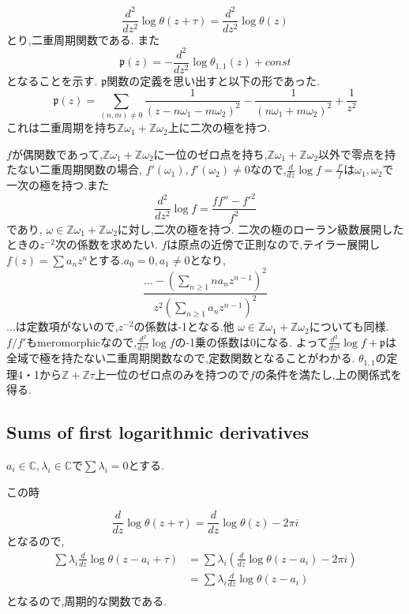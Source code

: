 \documentclass[uplatex,b5j,11pt]{jsbook}
\begin{document}
\begin{equation*}
    \frac{d^2}{dz^2}\log \theta(z + \tau)= \frac{d^2}{dz^2}\log \theta(z)
\end{equation*}
とり,二重周期関数である.
また
\begin{equation*}
    \mathfrak{p}(z) = - \frac{d^2}{dz^2} \log \theta_{1, 1}(z) + const
\end{equation*}
となることを示す.
$\mathfrak{p}$関数の定義を思い出すと以下の形であった.
\begin{equation*}
    \mathfrak{p}(z) = \sum_{(n,m) \neq 0} \frac{1}{(z - n \omega_1 - m \omega_2)^2} - \frac{1}{(n \omega_1 + m \omega_2)^2 } + \frac{1}{z^2}
\end{equation*}
これは二重周期を持ち$\mathbb{Z}\omega_1 + \mathbb{Z}\omega_2$上に二次の極を持つ.

$f$が偶関数であって,$\mathbb{Z}\omega_1 + \mathbb{Z}\omega_2$に一位のゼロ点を持ち,$\mathbb{Z}\omega_1 + \mathbb{Z}\omega_2$以外で零点を持たない二重周期関数の場合,
$f'(\omega_1) , f'(\omega_2) \neq 0$なので,$\frac{d}{dz} \log f = \frac{f'}{f}$は$\omega_1, \omega_2$で一次の極を持つ.また
\begin{equation*}
\frac{d^2}{dz^2}\log f = \frac{ f f'' - f'^2 }{f^2}
\end{equation*}
であり, $\omega \in \mathbb{Z}\omega_1 + \mathbb{Z}\omega_2$に対し,二次の極を持つ.
二次の極のローラン級数展開したときの$z^{-2}$次の係数を求めたい.
$f$は原点の近傍で正則なので,テイラー展開し$f(z)=\sum a_nz^n$とする.$a_0=0, a_1\neq 0$となり,
\begin{equation*}
\frac{... -  (\sum_{n \ge 1} n a_n z^{n-1})^2 }{z^2 (\sum_{n \ge 1} a_nz^{n-1})^2}
\end{equation*}
...は定数項がないので,$z^{-2}$の係数は-1となる.他 $\omega \in \mathbb{Z}\omega_1 + \mathbb{Z}\omega_2$についても同様.
$f/f'$もmeromorphicなので,$\frac{d^2}{dz^2}\log f$の-1乗の係数は0になる.
よって$\frac{d^2}{dz^2}\log f + \mathfrak{p}$は全域で極を持たない二重周期関数なので,定数関数となることがわかる.
$\theta_{1,1}$の定理4・1から$\mathbb{Z}+ \mathbb{Z}\tau$上一位のゼロ点のみを持つので$f$の条件を満たし,上の関係式を得る.


\subsection{Sums of first logarithmic derivatives}
$a_i \in \mathbb{C}, \lambda_i \in \mathbb{C}$で$\sum \lambda_i = 0$とする.

この時

\begin{equation*}
    \frac{d}{dz}\log \theta(z + \tau)= \frac{d}{dz}\log \theta(z) - 2\pi i
\end{equation*}
となるので,
\begin{align*}
    \sum \lambda_i \frac{d}{dz}\log \theta(z- a_i + \tau)   &= \sum \lambda_i (\frac{d}{dz}\log \theta(z- a_i)  - 2 \pi i) \\
     & = \sum \lambda_i \frac{d}{dz}\log \theta(z- a_i) \\
\end{align*}
となるので,周期的な関数である.
\end{document}
